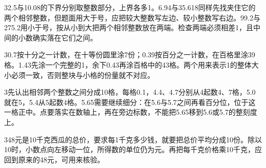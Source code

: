 \documentclass[multi=snippet,border={5bp 20bp 5bp 5bp}]{standalone}
\newenvironment{snippet}[3]{\begin{minipage}{#1bp}\color{answerred}\fontsize{#2}{#3}\selectfont\raggedright}{\end{minipage}}
\begin{document}
\begin{snippet}{505}{11.5}{14}\begin{multicols}{3}\raggedcolumns 2.5与10.08的下界分别取整数部分，上界各多1。6.94与35.618同样先找夹住它的两个相邻整数，但题面用大于号，应把较大整数写左边、较小整数写右边。99.2与275.2用小于号，按从小到大把两个相邻整数放在两端。检查两端必须相差1，且中间的小数确实落在它们之间。\end{multicols}\end{snippet}
\begin{snippet}{505}{11.5}{14}\begin{multicols}{3}\raggedcolumns 0.7按十分之一计数，在十等份圆里涂7份；0.39按百分之一计数，在百格里涂39格。1.43先涂一个完整的1，余下0.43再涂百格中的43格。两个用来表示1的整体大小必须一致，否则整块与小格的份量就不对应。\end{multicols}\end{snippet}
\begin{snippet}{505}{11.5}{14}\begin{multicols}{3}\raggedcolumns 先认出相邻两个整数之间分成10格，每格0.1，4.4、4.7分别从4起数4、7格，5.0就在5，5.4从5起数4格。5.65需要继续细分：在5.6与5.7之间再看百分位，位于这一格正中。点要落实在数轴上，再在旁边标数，不能把5.65移到5.6或5.7的整刻度上。\end{multicols}\end{snippet}
\begin{snippet}{505}{11.5}{14}\begin{multicols}{3}\raggedcolumns 48元是10千克西瓜的总价，要求每1千克多少钱，就要把总价平均分成10份。除以10时，小数点向左移动一位，所得数的单位仍为元。再把每千克价格乘10千克，应回到原来的48元，可用来核验。\end{multicols}\end{snippet}
\end{document}
